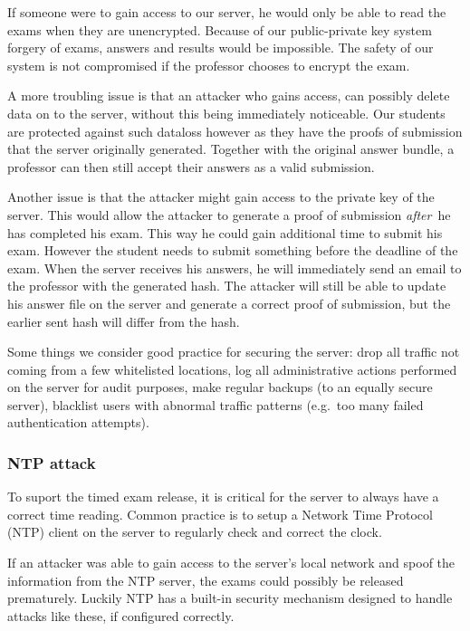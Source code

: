 \documentclass[12pt]{article}
\begin{document}
If someone were to gain access to our server, he would only be able to read the
exams when they are unencrypted. Because of our public-private key system
forgery of exams, answers and results would be impossible. The safety of our
system is not compromised if the professor chooses to encrypt the exam.

A more troubling issue is that an attacker who gains access, can possibly delete
data on to the server, without this being immediately noticeable. Our students
are protected against such dataloss however as they have the proofs of
submission that the server originally generated. Together with the original
answer bundle, a professor can then still accept their answers as a valid
submission.

Another issue is that the attacker might gain access to the private key of the
server. This would allow the attacker to generate a proof of submission
{\em after}\ he has completed his exam. This way he could gain additional time to
submit his exam. However the student needs to submit something before the
deadline of the exam. When the server receives his answers, he will immediately
send an email to the professor with the generated hash. The attacker will still
be able to update his answer file on the server and generate a correct proof of
submission, but the earlier sent hash will differ from the hash.

Some things we consider good practice for securing the server: drop all traffic
not coming from a few whitelisted locations, log all administrative actions
performed on the server for audit purposes, make regular backups (to an equally
secure server), blacklist users with abnormal traffic patterns (e.g.\ too many
failed authentication attempts).

\subsubsection{NTP attack}

To suport the timed exam release, it is critical for the server to always have a
correct time reading. Common practice is to setup a Network Time Protocol (NTP)
client on the server to regularly check and correct the clock.

If an attacker was able to gain access to the server's local network and spoof
the information from the NTP server, the exams could possibly be released
prematurely. Luckily NTP has a built-in security mechanism designed to handle
attacks like these, if configured correctly.
\end{document}
